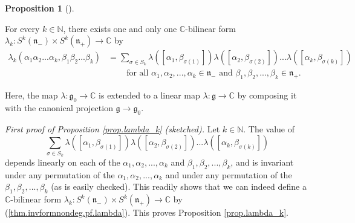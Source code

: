 \documentclass
[numbers=enddot,12pt,final,onecolumn,german,notitlepage]{scrartcl}%
\theoremstyle{definition}
\newtheorem{prop}[theo]{Proposition}
\newenvironment{proposition}[1][]
{\begin{prop}[#1]\begin{leftbar}}
{\end{leftbar}\end{prop}}
\begin{document}
\begin{proposition}
\label{prop.lambda_k}For every $k\in\mathbb{N}$, there exists one and only one
$\mathbb{C}$-bilinear form $\lambda_{k}:S^{k}\left(  \mathfrak{n}_{-}\right)
\times S^{k}\left(  \mathfrak{n}_{+}\right)  \rightarrow\mathbb{C}$ by
\begin{align}
\lambda_{k}\left(  \alpha_{1}\alpha_{2}...\alpha_{k},\beta_{1}\beta
_{2}...\beta_{k}\right)   &  =\sum\limits_{\sigma\in S_{k}}\lambda\left(
\left[  \alpha_{1},\beta_{\sigma\left(  1\right)  }\right]  \right)
\lambda\left(  \left[  \alpha_{2},\beta_{\sigma\left(  2\right)  }\right]
\right)  ...\lambda\left(  \left[  \alpha_{k},\beta_{\sigma\left(  k\right)
}\right]  \right) \nonumber\\
&  \ \ \ \ \ \ \ \ \ \ \text{for all }\alpha_{1},\alpha_{2},...,\alpha_{k}%
\in\mathfrak{n}_{-}\text{ and }\beta_{1},\beta_{2},...,\beta_{k}%
\in\mathfrak{n}_{+}. \label{thm.invformnondeg.pf.lambda}%
\end{align}

\end{proposition}

Here, the map $\lambda:\mathfrak{g}_{0}\rightarrow\mathbb{C}$ is extended to a
linear map $\lambda:\mathfrak{g}\rightarrow\mathbb{C}$ by composing it with
the canonical projection $\mathfrak{g}\rightarrow\mathfrak{g}_{0}$.

\textit{First proof of Proposition \ref{prop.lambda_k} (sketched).} Let
$k\in\mathbb{N}$. The value of
\[
\sum\limits_{\sigma\in S_{k}}\lambda\left(  \left[  \alpha_{1},\beta
_{\sigma\left(  1\right)  }\right]  \right)  \lambda\left(  \left[  \alpha
_{2},\beta_{\sigma\left(  2\right)  }\right]  \right)  ...\lambda\left(
\left[  \alpha_{k},\beta_{\sigma\left(  k\right)  }\right]  \right)
\]
depends linearly on each of the $\alpha_{1},\alpha_{2},...,\alpha_{k}$ and
$\beta_{1},\beta_{2},...,\beta_{k}$, and is invariant under any permutation of
the $\alpha_{1},\alpha_{2},...,\alpha_{k}$ and under any permutation of the
$\beta_{1},\beta_{2},...,\beta_{k}$ (as is easily checked). This readily shows
that we can indeed define a $\mathbb{C}$-bilinear form $\lambda_{k}%
:S^{k}\left(  \mathfrak{n}_{-}\right)  \times S^{k}\left(  \mathfrak{n}%
_{+}\right)  \rightarrow\mathbb{C}$ by (\ref{thm.invformnondeg.pf.lambda}).
This proves Proposition \ref{prop.lambda_k}.
\end{document}

